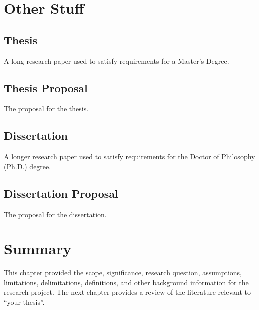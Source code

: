 \section{Other Stuff}

\subsection{Thesis}

A long research paper used to satisfy requirements for a Master's Degree.


\subsection{Thesis Proposal}

The proposal for the thesis.


\subsection{Dissertation}

A longer research paper used to satisfy requirements for the Doctor of Philosophy (Ph.D.) degree.


\subsection{Dissertation Proposal}

The proposal for the dissertation.


\section{Summary}

This chapter provided the scope, significance, research question, assumptions, limitations, delimitations, definitions, and other background information for the research project.
The next chapter provides a review of the literature relevant to ``your thesis''.

